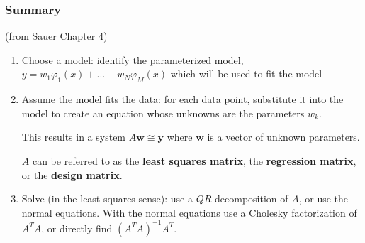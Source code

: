 \documentclass[12pt,letterpaper,noanswers]{exam}
\newcommand{\vc}[1]{\boldsymbol{#1}}
\begin{document}
\subsubsection{Summary}
\begin{tcolorbox}
(from Sauer Chapter 4)

\begin{enumerate}
    \item Choose a model: identify the parameterized model, $y = w_1\varphi_1(x) + ... + w_N\varphi_M(x)$ which will be used to fit the model
    \item Assume the model fits the data: for each data point, substitute it into the model to create an equation whose unknowns are the parameters $w_k$.  
   
    This results in a system $A\vc{w} \cong \vc{y}$ where $\vc{w}$ is a vector of unknown parameters.
    
    $A$ can be referred to as the \textbf{least squares matrix}, the \textbf{regression matrix}, or the \textbf{design matrix}.
    \item Solve (in the least squares sense): use a $QR$ decomposition of $A$, or use the normal equations.  With the normal equations use a Cholesky factorization of $A^TA$, or directly find $(A^TA)^{-1}A^T$.
\end{enumerate}
\end{tcolorbox}

\end{document}
